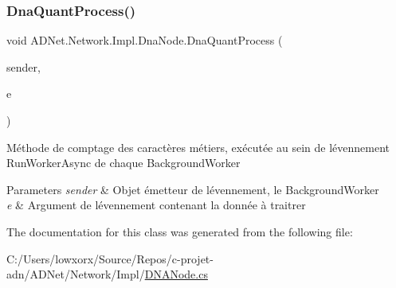 \subsubsection{\texorpdfstring{Dna\+Quant\+Process()}{DnaQuantProcess()}}
{\footnotesize\ttfamily void A\+D\+Net.\+Network.\+Impl.\+Dna\+Node.\+Dna\+Quant\+Process (\begin{DoxyParamCaption}\item[{object}]{sender,  }\item[{Do\+Work\+Event\+Args}]{e }\end{DoxyParamCaption})}



Méthode de comptage des caractères métiers, exécutée au sein de l\textquotesingle{}évennement Run\+Worker\+Async de chaque Background\+Worker 


\begin{DoxyParams}{Parameters}
{\em sender} & Objet émetteur de l\textquotesingle{}évennement, le Background\+Worker\\
\hline
{\em e} & Argument de l\textquotesingle{}évennement contenant la donnée à traitrer\\
\hline
\end{DoxyParams}


The documentation for this class was generated from the following file\+:\begin{DoxyCompactItemize}
\item 
C\+:/\+Users/lowxorx/\+Source/\+Repos/c-\/projet-\/adn/\+A\+D\+Net/\+Network/\+Impl/\hyperlink{_d_n_a_node_8cs}{D\+N\+A\+Node.\+cs}\end{DoxyCompactItemize}
